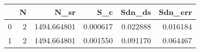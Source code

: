 \begin{tabular}{lrrrrr}
\toprule
 & N & N_sr & S_c & Sdn_ds & Sdn_err \\
\midrule
0 & 2 & 1494.664801 & 0.000617 & 0.022888 & 0.016184 \\
1 & 2 & 1494.664801 & 0.001550 & 0.091170 & 0.064467 \\
\bottomrule
\end{tabular}

